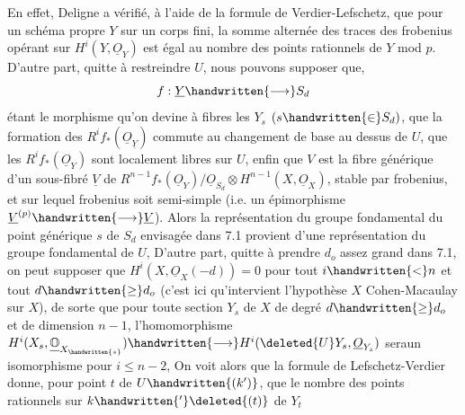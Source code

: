 En effet, Deligne a vérifié, à l'aide de la formule de Verdier-Lefschetz, que pour un schéma propre $Y$ sur un corps fini, la somme alternée des traces  des frobenius opérant sur $H^i(Y,\underline{O}_Y)$ est  égal au nombre des points rationnels de $Y$ mod $p$. D'autre part, quitte à restreindre $U$, nous pouvons supposer que,
\[
f:\underline{Y}\handwritten{\longrightarrow} S_d
\]
étant le morphisme qu'on devine à fibres les $Y_s$ $(s\handwritten{\in}S_d)$, que  la formation des $R^if_*(\underline{O}_{\underline{Y}})$ commute au changement de base au dessus de $U$,  que les $R^if_*(\underline{O}_Y)$ sont localement libres sur $U$, enfin que $V$ est la fibre  générique d'un sous-fibré $\underline{V}$ de $R^{n-1}f_*(\underline{O}_Y)/\underline{O}_{S_d}\otimes H^{n-1}(X,\underline{O}_X)$, stable par frobenius, et sur lequel frobenius soit semi-simple (i.e. un épimorphisme $\underline{V}^{(p)}\handwritten{\longrightarrow}\underline{V}$). Alors la représentation du groupe fondamental du point générique $s$ de $S_d$ envisagée dans 7.1 provient d'une représentation du groupe fondamental  \handwritten{$\pi$} de $U$,  D'autre part, quitte à prendre $d_o$ assez grand dans 7.1, on peut supposer que  $H^i(X,\underline{O}_X(-d))=0$ pour tout $i\handwritten{<}n$ et tout $d\handwritten{\geq}d_o$ (c'est ici qu'intervient l'hypothèse $X$ Cohen-Macaulay sur $X$), de sorte que pour toute section $Y_s$ de $X$ de degré $d\handwritten{\geq}d_o$ et de dimension $n-1$, l'homomorphisme $H^i(X_s,\underline{\mathbb{O}}_{X_{\handwritten{s}}})\handwritten{\longrightarrow}H^i(\deleted{U}Y_s,\underline{O}_{Y_s})$ sera\handwritten{$|$}un isomorphisme pour $i\leq n-2$,  On voit alors que la formule de Lefschetz-Verdier donne, pour  point  $t$ de $U\handwritten{(k')}$, que le nombre des points rationnels sur $k\handwritten{'}\deleted{(t)}$ de $Y_t$ 

